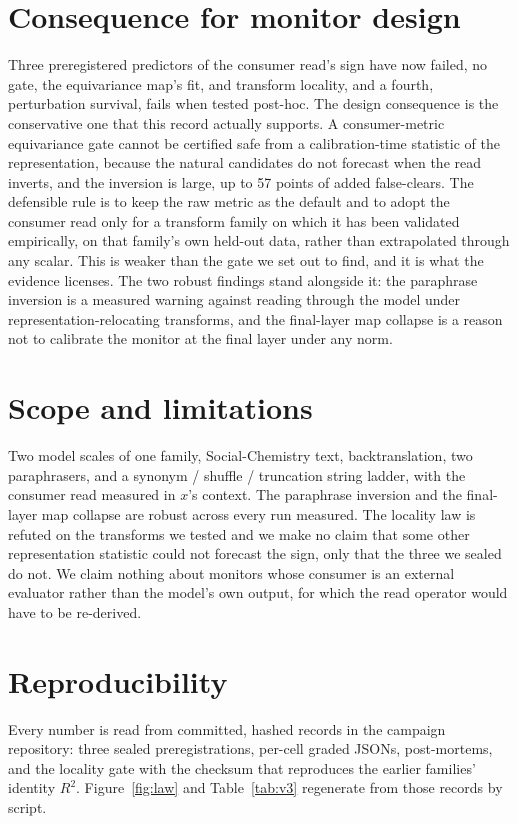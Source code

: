 \documentclass[11pt]{article}
\begin{document}
\section{Consequence for monitor design}

Three preregistered predictors of the consumer read's sign have now failed, no
gate, the equivariance map's fit, and transform locality, and a fourth,
perturbation survival, fails when tested post-hoc. The design consequence is the
conservative one that this record actually supports. A
consumer-metric equivariance gate cannot be certified safe from a
calibration-time statistic of the representation, because the natural candidates
do not forecast when the read inverts, and the inversion is large, up to 57
points of added false-clears. The defensible rule is to keep the raw metric as
the default and to adopt the consumer read only for a transform family on which
it has been validated empirically, on that family's own held-out data, rather
than extrapolated through any scalar. This is weaker than the gate we set out to
find, and it is what the evidence licenses. The two robust findings stand
alongside it: the paraphrase inversion is a measured warning against reading
through the model under representation-relocating transforms, and the final-layer
map collapse is a reason not to calibrate the monitor at the final layer under
any norm.

\section{Scope and limitations}

Two model scales of one family, Social-Chemistry text, backtranslation, two
paraphrasers, and a synonym / shuffle / truncation string ladder, with the
consumer read measured in $x$'s context. The paraphrase inversion and the
final-layer map collapse are robust across every run measured. The locality law
is refuted on the transforms we tested and we make no claim that some other
representation statistic could not forecast the sign, only that the three we
sealed do not. We claim nothing about monitors whose consumer is an external
evaluator rather than the model's own output, for which the read operator would
have to be re-derived.

\section*{Reproducibility}
Every number is read from committed, hashed records in the campaign repository:
three sealed preregistrations, per-cell graded JSONs, post-mortems, and the
locality gate with the checksum that reproduces the earlier families' identity
$R^2$. Figure~\ref{fig:law} and Table~\ref{tab:v3} regenerate from those records
by script.
\end{document}
